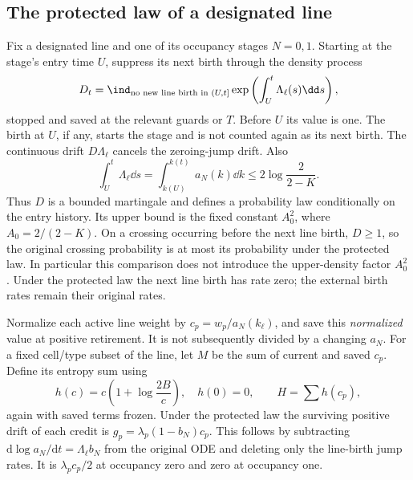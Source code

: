 \subsection{The protected law of a designated line}
Fix a designated line and one of its occupancy stages \(N=0,1\).
Starting at the stage's entry time \(U\), suppress its next birth
through the density process
\[
 D_t=\ind_{\text{no new line birth in }(U,t]}
 \exp\left(\int_U^t\Lambda_\ell(s)\dd s\right),
\]
stopped and saved at the relevant guards or \(T\). Before \(U\) its
value is one. The birth at \(U\), if any, starts the stage and is
not counted again as its next birth. The continuous drift
\(D\Lambda_\ell\) cancels the zeroing-jump drift. Also
\[
 \int_U^t\Lambda_\ell\dd s
 =\int_{k(U)}^{k(t)}a_N(k)\dd k
 \le2\log\frac2{2-K}.
\]
Thus \(D\) is a bounded martingale and defines a probability law
conditionally on the entry history. Its upper bound is the fixed
constant \(A_0^2\), where \(A_0=2/(2-K)\). On a crossing occurring
before the next line birth, \(D\ge1\), so the original crossing
probability is at most its probability under the protected law.
In particular this comparison does not introduce the upper-density
factor \(A_0^2\). Under the protected law the next line birth has
rate zero; the external birth rates remain their original rates.

Normalize each active line weight by
\(c_p=w_p/a_N(k_\ell)\), and save this \emph{normalized} value at
positive retirement. It is not subsequently divided by a changing
\(a_N\). For a fixed cell/type subset of the line, let \(M\) be the
sum of current and saved \(c_p\). Define its entropy sum using
\[
 h(c)=c\left(1+\log\frac{2B}{c}\right),\quad h(0)=0,
 \qquad H=\sum h(c_p),
\]
again with saved terms frozen. Under the protected law the surviving
positive drift of each credit is
\(g_p=\lambda_p(1-b_N)c_p\). This follows by subtracting
\(\mathrm d\log a_N/\mathrm dt=\Lambda_\ell b_N\) from the original
ODE and deleting only the line-birth jump rates. It is
\(\lambda_pc_p/2\) at occupancy zero and zero at occupancy one.

